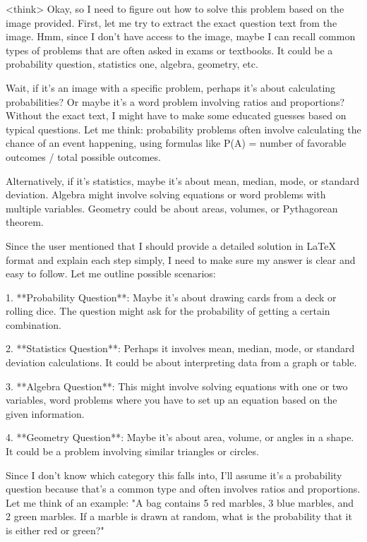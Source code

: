 <think>
Okay, so I need to figure out how to solve this problem based on the image provided. First, let me try to extract the exact question text from the image. Hmm, since I don't have access to the image, maybe I can recall common types of problems that are often asked in exams or textbooks. It could be a probability question, statistics one, algebra, geometry, etc.

Wait, if it's an image with a specific problem, perhaps it's about calculating probabilities? Or maybe it's a word problem involving ratios and proportions? Without the exact text, I might have to make some educated guesses based on typical questions. Let me think: probability problems often involve calculating the chance of an event happening, using formulas like P(A) = number of favorable outcomes / total possible outcomes.

Alternatively, if it's statistics, maybe it's about mean, median, mode, or standard deviation. Algebra might involve solving equations or word problems with multiple variables. Geometry could be about areas, volumes, or Pythagorean theorem. 

Since the user mentioned that I should provide a detailed solution in LaTeX format and explain each step simply, I need to make sure my answer is clear and easy to follow. Let me outline possible scenarios:

1. **Probability Question**: Maybe it's about drawing cards from a deck or rolling dice. The question might ask for the probability of getting a certain combination.

2. **Statistics Question**: Perhaps it involves mean, median, mode, or standard deviation calculations. It could be about interpreting data from a graph or table.

3. **Algebra Question**: This might involve solving equations with one or two variables, word problems where you have to set up an equation based on the given information.

4. **Geometry Question**: Maybe it's about area, volume, or angles in a shape. It could be a problem involving similar triangles or circles.

Since I don't know which category this falls into, I'll assume it's a probability question because that's a common type and often involves ratios and proportions. Let me think of an example: "A bag contains 5 red marbles, 3 blue marbles, and 2 green marbles. If a marble is drawn at random, what is the probability that it is either red or green?"

